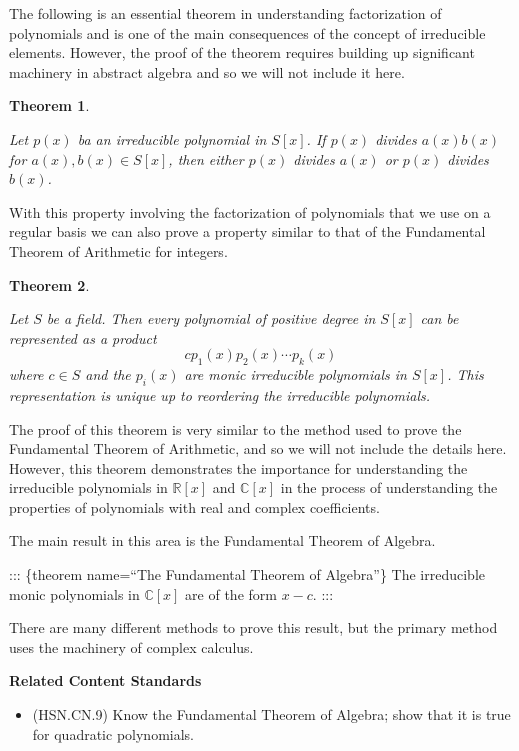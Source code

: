 \documentclass[
]{book}
\providecommand{\tightlist}{%
  \setlength{\itemsep}{0pt}\setlength{\parskip}{0pt}}
\newenvironment{standards}{}{}
\newtheorem{theorem}{Theorem}[chapter]
\theoremstyle{definition}
\theoremstyle{definition}
\theoremstyle{definition}
\theoremstyle{definition}
\theoremstyle{remark}
\begin{document}
The following is an essential theorem in understanding factorization of polynomials and is one of the main consequences of the concept of irreducible elements. However, the proof of the theorem requires building up significant machinery in abstract algebra and so we will not include it here.

\begin{theorem}
\protect\hypertarget{thm:unlabeled-div-128}{}\label{thm:unlabeled-div-128}

Let \(p(x)\) ba an irreducible polynomial in \(S[x]\). If \(p(x)\) divides \(a(x)b(x)\) for \(a(x),b(x)\in S[x]\), then either \(p(x)\) divides \(a(x)\) or \(p(x)\) divides \(b(x)\).

\end{theorem}

With this property involving the factorization of polynomials that we use on a regular basis we can also prove a property similar to that of the Fundamental Theorem of Arithmetic for integers.

\begin{theorem}
\protect\hypertarget{thm:polynomial-factorization}{}\label{thm:polynomial-factorization}

Let \(S\) be a field. Then every polynomial of positive degree in \(S[x]\) can be represented as a product
\[ c p_1(x) p_2(x) \cdots p_k(x)\] where \(c\in S\) and the \(p_i(x)\) are monic irreducible polynomials in \(S[x]\). This representation is unique up to reordering the irreducible polynomials.

\end{theorem}

The proof of this theorem is very similar to the method used to prove the Fundamental Theorem of Arithmetic, and so we will not include the details here. However, this theorem demonstrates the importance for understanding the irreducible polynomials in \(\mathbb{R}[x]\) and \(\mathbb{C}[x]\) in the process of understanding the properties of polynomials with real and complex coefficients.

The main result in this area is the Fundamental Theorem of Algebra.

::: \{theorem name=``The Fundamental Theorem of Algebra''\}
The irreducible monic polynomials in \(\mathbb{C}[x]\) are of the form \(x-c\).
:::

There are many different methods to prove this result, but the primary method uses the machinery of complex calculus.

\begin{standards}

\begin{center}
\textbf{Related Content Standards}

\end{center}

\begin{itemize}
\tightlist
\item
  (HSN.CN.9) Know the Fundamental Theorem of Algebra; show that it is true for quadratic polynomials.
\end{itemize}

\end{standards}
\end{document}
